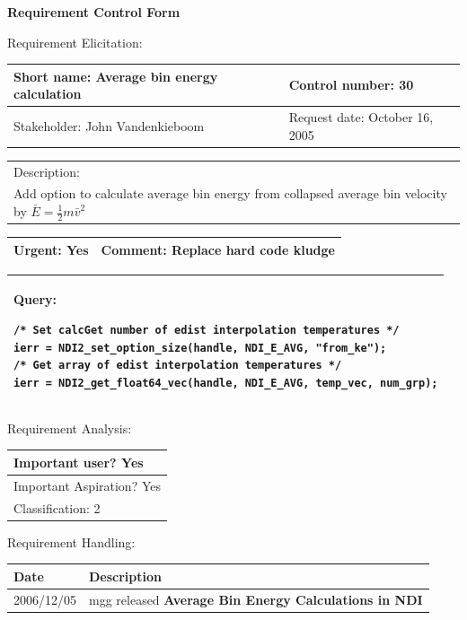 \begin{center}\Large\bf
Requirement Control Form
\end{center}
\vspace{24pt}

Requirement Elicitation:

\begin{tabular}{|p{211pt}|p{211pt}|} \hline
Short name: Average bin energy calculation & Control number: 30\\ \hline
Stakeholder: John Vandenkieboom & Request date: October 16, 2005\\
\end{tabular}
\begin{tabular}{|p{433pt}|} \hline
Description: \\ 
Add option to calculate average bin energy from collapsed average bin
velocity by $\bar{E} = \frac{1}{2} m \bar{v}^2$ \\ \hline
\end{tabular}
\begin{tabular}{|p{211pt}|p{211pt}|} \hline
Urgent: Yes & Comment: Replace hard code kludge\\ \hline
\end{tabular}

\vspace{12pt}

\begin{tabular}{|p{433pt}|} \hline
Query: 
\begin{verbatim}
/* Set calcGet number of edist interpolation temperatures */
ierr = NDI2_set_option_size(handle, NDI_E_AVG, "from_ke");
/* Get array of edist interpolation temperatures */
ierr = NDI2_get_float64_vec(handle, NDI_E_AVG, temp_vec, num_grp);
\end{verbatim}
\\ \hline
\end{tabular}
\vspace{24pt}

Requirement Analysis:

\begin{tabular}{|p{433pt}|} \hline
Important user? Yes \\ \hline
Important Aspiration? Yes \\ \hline
Classification: 2 \\ \hline
\end{tabular}

Requirement Handling:

\begin{tabular}{|p{72pt}|p{351pt}|} \hline
Date & Description \\ \hline
2006/12/05 & mgg released \textbf{Average Bin Energy Calculations in NDI} \\ \hline
\end{tabular}
